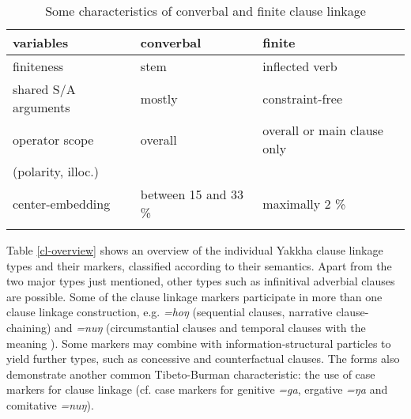 \begin{table}[htp]
\begin{centering}
\begin{tabular}{lll}
\lsptoprule
{\sc variables}&{\sc converbal} & {\sc finite}\\
\midrule
finiteness&stem&inflected verb\\
shared S/A arguments&mostly&constraint-free\\
operator scope&overall &overall or main clause only\\
(polarity, illoc.)&&\\
center-embedding&between 15 and 33 \%&maximally 2 \%\\
\lspbottomrule
\end{tabular}
\caption{Some characteristics of converbal and finite clause linkage}\label{cl-twotypes}
\end{centering}
\end{table}



Table \ref{cl-overview} shows an overview of the individual  Yakkha clause linkage types and their markers, classified according to their semantics. Apart from the two major types just mentioned, other types such as infinitival adverbial clauses are possible. Some of the clause linkage markers participate in more than one clause linkage construction, e.g. \emph{=hoŋ} (sequential clauses, narrative clause-chaining) and \emph{=nuŋ} (circumstantial clauses and temporal clauses with the meaning ).  Some markers may combine with information-structural particles to yield further types, such as concessive and counterfactual clauses. The forms also demonstrate another common Tibeto-Burman characteristic: the use of case markers for clause linkage (cf. case markers for genitive \emph{=ga}, ergative \emph{=ŋa} and comitative \emph{=nuŋ}). 

